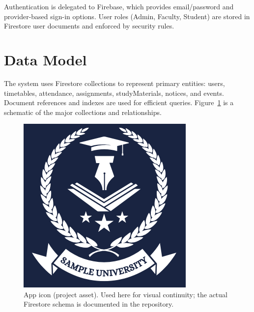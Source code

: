 \documentclass[conference]{IEEEtran}
\begin{document}
Authentication is delegated to Firebase, which provides email/password and provider-based sign-in options. User roles (Admin, Faculty, Student) are stored in Firestore user documents and enforced by security rules.

\section{Data Model}
The system uses Firestore collections to represent primary entities: users, timetables, attendance, assignments, studyMaterials, notices, and events. Document references and indexes are used for efficient queries. Figure~\ref{fig:firestore} is a schematic of the major collections and relationships.

\begin{figure}[h]
    \centering
    \includegraphics[width=0.6\columnwidth]{assets/icon.png}
    \caption{App icon (project asset). Used here for visual continuity; the actual Firestore schema is documented in the repository.}
    \label{fig:firestore}
\end{figure}
\end{document}
